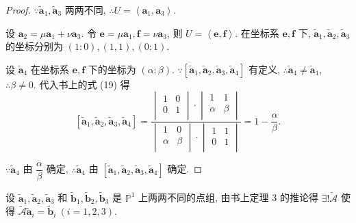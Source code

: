 \documentclass{ctexart}
\begin{document}
\begin{proof}
    $\because\tilde{\boldsymbol{a}}_1,\tilde{\boldsymbol{a}}_3$ 两两不同, $\therefore U=\left<\boldsymbol{a}_1,\boldsymbol{a}_3\right>$.
    
    设 $\boldsymbol{a}_2=\mu\boldsymbol{a}_1+\nu\boldsymbol{a}_3$. 令 $\boldsymbol{e}=\mu\boldsymbol{a}_1,\boldsymbol{f}=\nu\boldsymbol{a}_3$, 则 $U=\left<\boldsymbol{e},\boldsymbol{f}\right>$. 在坐标系 $\boldsymbol{e},\boldsymbol{f}$ 下, $\tilde{\boldsymbol{a}}_1,\tilde{\boldsymbol{a}}_2,\tilde{\boldsymbol{a}}_3$ 的坐标分别为 $(1:0),(1,1),(0:1)$.
    
    设 $\tilde{\boldsymbol{a}}_4$ 在坐标系 $\boldsymbol{e},\boldsymbol{f}$ 下的坐标为 $(\alpha:\beta)$. $\because[\tilde{\boldsymbol{a}}_1,\tilde{\boldsymbol{a}}_2,\tilde{\boldsymbol{a}}_3,\tilde{\boldsymbol{a}}_4]$ 有定义, $\therefore\tilde{\boldsymbol{a}}_4\neq\tilde{\boldsymbol{a}}_1$, $\therefore\beta\neq0$. 代入书上的式 (19) 得
    \[[\tilde{\boldsymbol{a}}_1,\tilde{\boldsymbol{a}}_2,\tilde{\boldsymbol{a}}_3,\tilde{\boldsymbol{a}}_4]=\dfrac{\begin{vmatrix}
        1 & 0 \\
        0 & 1 \\
    \end{vmatrix}\cdot\begin{vmatrix}
        1 & 1 \\
        \alpha & \beta \\
    \end{vmatrix}}{\begin{vmatrix}
        1 & 0 \\
        \alpha & \beta \\
    \end{vmatrix}\cdot\begin{vmatrix}
        1 & 1 \\
        0 & 1 \\
    \end{vmatrix}}=1-\dfrac{\alpha}{\beta}.\]

    $\because\tilde{\boldsymbol{a}}_4$ 由 $\dfrac{\alpha}{\beta}$ 确定, $\therefore\tilde{\boldsymbol{a}}_4$ 由 $[\tilde{\boldsymbol{a}}_1,\tilde{\boldsymbol{a}}_2,\tilde{\boldsymbol{a}}_3,\tilde{\boldsymbol{a}}_4]$ 确定.
\end{proof}
设 $\tilde{\boldsymbol{a}}_1,\tilde{\boldsymbol{a}}_2,\tilde{\boldsymbol{a}}_3$ 和 $\tilde{\boldsymbol{b}}_1,\tilde{\boldsymbol{b}}_2,\tilde{\boldsymbol{b}}_3$ 是 $\mathbb{P}^1$ 上两两不同的点组, 由书上定理 3 的推论得 $\exists!\widetilde{\mathcal{A}}$ 使得 $\widetilde{\mathcal{A}}\tilde{\boldsymbol{a}}_i=\tilde{\boldsymbol{b}}_i\ (i=1,2,3)$.
\end{document}

